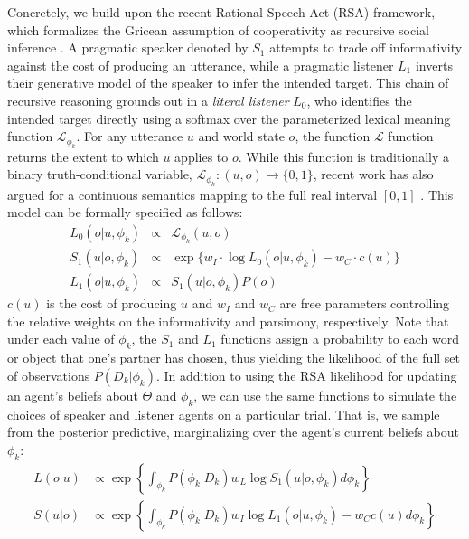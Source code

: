 Concretely, we build upon the recent Rational Speech Act (RSA) framework, which formalizes the Gricean assumption of cooperativity as recursive social inference \cite{GoodmanFrank16_RSATiCS}.
A pragmatic speaker denoted by $S_1$ attempts to trade off informativity against the cost of producing an utterance, while a pragmatic listener $L_1$ inverts their generative model of the speaker to infer the intended target.
This chain of recursive reasoning grounds out in a \emph{literal listener} $L_0$, who identifies the intended target directly using a softmax over the parameterized lexical meaning function $\mathcal{L}_{\phi_k}$. 
For any utterance $u$ and world state $o$, the function $\mathcal{L}$ function returns the extent to which $u$ applies to $o$.
While this function is traditionally a binary truth-conditional variable, $\mathcal{L}_{\phi_k}: (u,o) \rightarrow \{0,1\}$, recent work has also argued for a continuous semantics mapping to the full real interval $[0,1]$  \cite{degen2020redundancy}.
This model can be formally specified as follows:
$$
\begin{array}{rcl}
L_0(o | u, \phi_k) &\propto  & \mathcal{L}_{\phi_k}(u,o) \\
S_1(u | o, \phi_k) &\propto &  \exp\{w_I \cdot \log L_0(o | u, \phi_k) - w_C \cdot c(u)\}   \\
L_1(o | u, \phi_k) &\propto  & S_1(u | o, \phi_k) P(o) 
\end{array}
$$
$c(u)$ is the cost of producing $u$ and $w_I$ and $w_C$ are free parameters controlling the relative weights on the informativity and parsimony, respectively.
Note that under each value of $\phi_k$, the $S_1$ and $L_1$ functions assign a probability to each word or object that one's partner has chosen, thus yielding the likelihood of the full set of observations $P(D_k | \phi_k)$.
In addition to using the RSA likelihood for updating an agent's beliefs about $\Theta$ and $\phi_k$, we can use the same functions to simulate the choices of speaker and listener agents on a particular trial.
That is, we sample from the posterior predictive, marginalizing over the agent's current beliefs about $\phi_k$:
\begin{align}
L(o|u) &\propto   \exp\left\{ \textstyle{\int_{\phi_k}} P(\phi_k | D_k) w_L \log S_1(u|o, \phi_k)d\phi_k\right\}\label{eq:marginalized}\\
S(u|o) &\propto  \exp\left\{ \textstyle{\int_{\phi_k}} P(\phi_k | D_k)  w_I \log L_1(o| u, \phi_k) - w_C c(u)d\phi_k\right\}\nonumber
\end{align}

